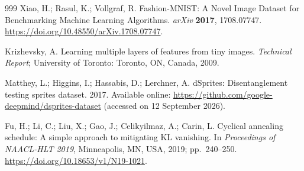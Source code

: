 \documentclass[make,article,submit,pdftex,moreauthors]{Definitions/mdpi}
\begin{document}
\begin{thebibliography}{999}
Xiao, H.; Rasul, K.; Vollgraf, R.
Fashion-{MNIST}: A Novel Image Dataset for Benchmarking Machine Learning
Algorithms.
\textit{arXiv} \textbf{2017}, 1708.07747. \url{https://doi.org/10.48550/arXiv.1708.07747}.

Krizhevsky, A.
Learning multiple layers of features from tiny images.
\textit{Technical Report}; University of Toronto: Toronto, ON, Canada,
2009.

Matthey, L.; Higgins, I.; Hassabis, D.; Lerchner, A.
dSprites: Disentanglement testing sprites dataset. 2017.
Available online: \url{https://github.com/google-deepmind/dsprites-dataset}
(accessed on 12 September 2026).

Fu, H.; Li, C.; Liu, X.; Gao, J.; Celikyilmaz, A.; Carin, L.
Cyclical annealing schedule: A simple approach to mitigating KL vanishing.
In \textit{Proceedings of NAACL-HLT 2019}, Minneapolis, MN, USA, 2019;
pp.~240--250. \url{https://doi.org/10.18653/v1/N19-1021}.

\end{thebibliography}
\end{document}
